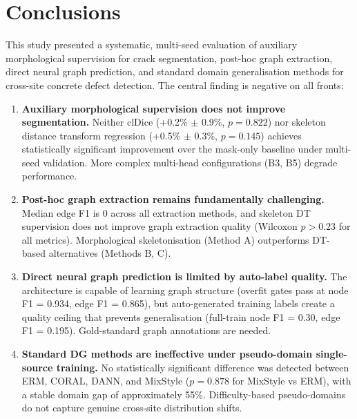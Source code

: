 \documentclass[preprint,12pt]{elsarticle}
\begin{document}

\section{Conclusions}
\label{sec:conclusions}

This study presented a systematic, multi-seed evaluation of auxiliary morphological supervision for crack segmentation, post-hoc graph extraction, direct neural graph prediction, and standard domain generalisation methods for cross-site concrete defect detection. The central finding is negative on all fronts:

\begin{enumerate}
    \item \textbf{Auxiliary morphological supervision does not improve segmentation.} Neither clDice (+0.2\% $\pm$ 0.9\%, $p = 0.822$) nor skeleton distance transform regression (+0.5\% $\pm$ 0.3\%, $p = 0.145$) achieves statistically significant improvement over the mask-only baseline under multi-seed validation. More complex multi-head configurations (B3, B5) degrade performance.

    \item \textbf{Post-hoc graph extraction remains fundamentally challenging.} Median edge F1 is 0 across all extraction methods, and skeleton DT supervision does not improve graph extraction quality (Wilcoxon $p > 0.23$ for all metrics). Morphological skeletonisation (Method A) outperforms DT-based alternatives (Methods B, C).

    \item \textbf{Direct neural graph prediction is limited by auto-label quality.} The architecture is capable of learning graph structure (overfit gates pass at node F1 = 0.934, edge F1 = 0.865), but auto-generated training labels create a quality ceiling that prevents generalisation (full-train node F1 = 0.30, edge F1 = 0.195). Gold-standard graph annotations are needed.

    \item \textbf{Standard DG methods are ineffective under pseudo-domain single-source training.} No statistically significant difference was detected between ERM, CORAL, DANN, and MixStyle ($p = 0.878$ for MixStyle vs ERM), with a stable domain gap of approximately 55\%. Difficulty-based pseudo-domains do not capture genuine cross-site distribution shifts.
\end{enumerate}
\end{document}
